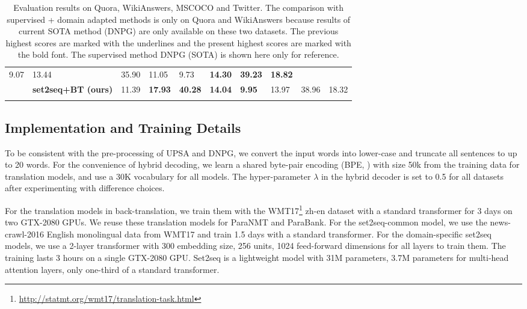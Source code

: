 \begin{table*}[ht]
\begin{tabular}{p{2cm}p{3.6cm}p{0.8cm}<{\centering}p{0.8cm}<{\centering}p{0.8cm}<{\centering}p{0.8cm}<{\centering}p{0.8cm}<{\centering}p{0.8cm}<{\centering}p{0.8cm}<{\centering}p{0.8cm}<{\centering}}
 9.07 & 13.44 & 35.90 & 11.05 &  9.73 & \textbf{14.30} & \textbf{39.23} & \textbf{18.82} \\
& \textbf{set2seq+BT \scriptsize{(ours)}} & 
11.39 & \textbf{17.93} & \textbf{40.28} & \textbf{14.04} & \textbf{9.95} & 13.97 & 38.96 & 18.32 \\
\\ [-1.8ex]
\hline
\end{tabular}
\caption{
Evaluation results on Quora, WikiAnswers, MSCOCO and Twitter. The comparison 
with supervised + domain adapted methods is only on Quora and WikiAnswers 
because results of current SOTA method (DNPG) are only available on these 
two datasets.
The previous highest scores are marked with the underlines and the present highest scores are marked with the bold font.
The supervised method DNPG (SOTA) is shown here only for reference.}
\label{tab:result}
\end{table*}

\subsection{Implementation and Training Details} \label{sec:exset}
To be consistent with the pre-processing of UPSA and DNPG, we convert the input words into lower-case and truncate all sentences to up to 20 words. 
For the convenience of hybrid decoding, 
we learn a shared byte-pair encoding (BPE, \cite{sennrich2016edinburgh}) 
with size 50k from the training data for translation models, 
and use a 30K vocabulary for all models. 
The hyper-parameter $\lambda$ in the hybrid decoder
is set to 0.5 for all datasets after experimenting with difference
choices.

For the translation models in back-translation, we train them with the WMT17\footnote{\url{http://statmt.org/wmt17/translation-task.html}} zh-en dataset \cite{ziemski2016united} with a standard transformer for 3 days on two GTX-2080 GPUs. We reuse these translation models for ParaNMT and ParaBank. For the set2seq-common model, we use the news-crawl-2016 English monolingual data from WMT17 and train 1.5 days with a standard transformer. For the domain-specific set2seq models, we use a 2-layer transformer with 300 embedding size, 256 units, 1024 feed-forward dimensions for all layers to train them. The training lasts 3 hours on a single GTX-2080 GPU. Set2seq is a lightweight model with 31M parameters, 3.7M parameters for multi-head attention layers, only one-third of a standard transformer.

